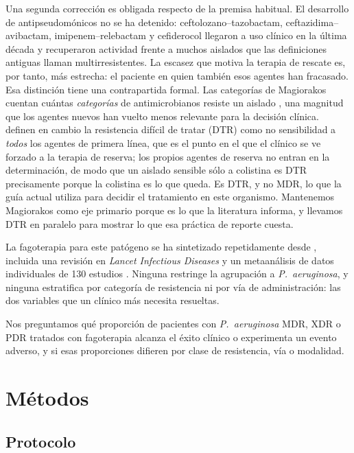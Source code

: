 \documentclass[12pt]{article}
\begin{document}
Una segunda corrección es obligada respecto de la premisa habitual. El desarrollo
de antipseudomónicos no se ha detenido: ceftolozano--tazobactam,
ceftazidima--avibactam, imipenem--relebactam y cefiderocol llegaron a uso clínico
en la última década y recuperaron actividad frente a muchos aislados que las
definiciones antiguas llaman multirresistentes. La escasez que motiva la terapia
de rescate es, por tanto, más estrecha: el paciente en quien también esos agentes
han fracasado. Esa distinción tiene una contrapartida formal. Las categorías de
Magiorakos cuentan cuántas \emph{categorías} de antimicrobianos resiste un
aislado \parencite{Magiorakos2012_mdrxdr}, una magnitud que los agentes nuevos
han vuelto menos relevante para la decisión clínica. \textcite{Kadri2018_dtr}
definen en cambio la resistencia difícil de tratar (DTR) como no sensibilidad a
\emph{todos} los agentes de primera línea, que es el punto en el que el clínico
se ve forzado a la terapia de reserva; los propios agentes de reserva no entran
en la determinación, de modo que un aislado sensible sólo a colistina es DTR
precisamente porque la colistina es lo que queda. Es DTR, y no MDR, lo que la
guía actual utiliza para decidir el tratamiento en este organismo. Mantenemos
Magiorakos como eje primario porque es lo que la literatura informa, y llevamos
DTR en paralelo para mostrar lo que esa práctica de reporte cuesta.

La fagoterapia para este patógeno se ha sintetizado repetidamente desde
\textcite{ElHaddad2019_eskape}, incluida una revisión en \textit{Lancet
Infectious Diseases} \parencite{Uyttebroek2022_lancetid} y un metaanálisis de
datos individuales de 130 estudios \parencite{Liu2025_ijaa}. Ninguna restringe la
agrupación a \textit{P.\ aeruginosa}, y ninguna estratifica por categoría de
resistencia ni por vía de administración: las dos variables que un clínico más
necesita resueltas.

Nos preguntamos qué proporción de pacientes con \textit{P.\ aeruginosa}
MDR, XDR o PDR tratados con fagoterapia alcanza el éxito clínico o experimenta un
evento adverso, y si esas proporciones difieren por clase de resistencia, vía o
modalidad.

\section{Métodos}

\subsection*{Protocolo}
\end{document}
